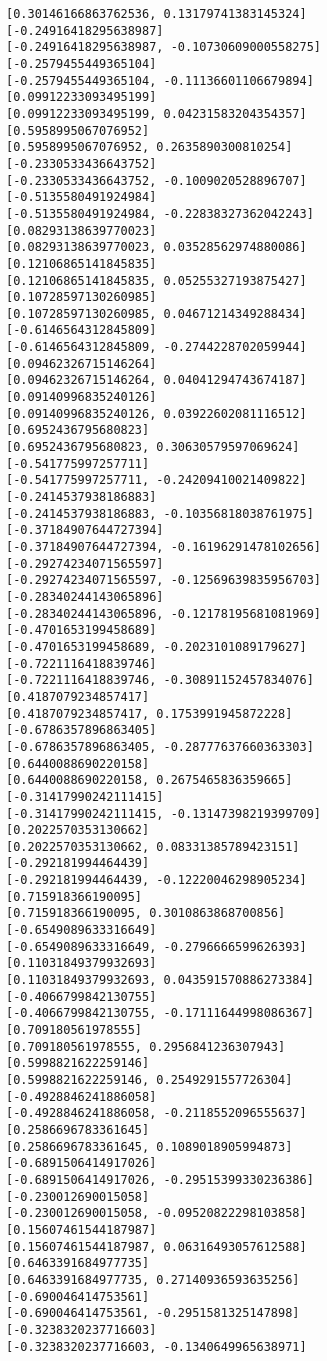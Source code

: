\documentclass[11pt]{article}
\begin{document}
\begin{Verbatim}[commandchars=\\\{\}]
[0.30146166863762536, 0.13179741383145324]
[-0.24916418295638987]
[-0.24916418295638987, -0.10730609000558275]
[-0.2579455449365104]
[-0.2579455449365104, -0.11136601106679894]
[0.09912233093495199]
[0.09912233093495199, 0.04231583204354357]
[0.5958995067076952]
[0.5958995067076952, 0.2635890300810254]
[-0.2330533436643752]
[-0.2330533436643752, -0.1009020528896707]
[-0.5135580491924984]
[-0.5135580491924984, -0.22838327362042243]
[0.08293138639770023]
[0.08293138639770023, 0.03528562974880086]
[0.12106865141845835]
[0.12106865141845835, 0.05255327193875427]
[0.10728597130260985]
[0.10728597130260985, 0.04671214349288434]
[-0.6146564312845809]
[-0.6146564312845809, -0.2744228702059944]
[0.09462326715146264]
[0.09462326715146264, 0.04041294743674187]
[0.09140996835240126]
[0.09140996835240126, 0.03922602081116512]
[0.6952436795680823]
[0.6952436795680823, 0.30630579597069624]
[-0.541775997257711]
[-0.541775997257711, -0.24209410021409822]
[-0.2414537938186883]
[-0.2414537938186883, -0.10356818038761975]
[-0.37184907644727394]
[-0.37184907644727394, -0.16196291478102656]
[-0.29274234071565597]
[-0.29274234071565597, -0.12569639835956703]
[-0.28340244143065896]
[-0.28340244143065896, -0.12178195681081969]
[-0.4701653199458689]
[-0.4701653199458689, -0.2023101089179627]
[-0.7221116418839746]
[-0.7221116418839746, -0.30891152457834076]
[0.4187079234857417]
[0.4187079234857417, 0.1753991945872228]
[-0.6786357896863405]
[-0.6786357896863405, -0.28777637660363303]
[0.6440088690220158]
[0.6440088690220158, 0.2675465836359665]
[-0.31417990242111415]
[-0.31417990242111415, -0.13147398219399709]
[0.2022570353130662]
[0.2022570353130662, 0.08331385789423151]
[-0.292181994464439]
[-0.292181994464439, -0.12220046298905234]
[0.715918366190095]
[0.715918366190095, 0.3010863868700856]
[-0.6549089633316649]
[-0.6549089633316649, -0.2796666599626393]
[0.11031849379932693]
[0.11031849379932693, 0.043591570886273384]
[-0.4066799842130755]
[-0.4066799842130755, -0.17111644998086367]
[0.709180561978555]
[0.709180561978555, 0.2956841236307943]
[0.5998821622259146]
[0.5998821622259146, 0.2549291557726304]
[-0.4928846241886058]
[-0.4928846241886058, -0.2118552096555637]
[0.2586696783361645]
[0.2586696783361645, 0.1089018905994873]
[-0.6891506414917026]
[-0.6891506414917026, -0.29515399330236386]
[-0.230012690015058]
[-0.230012690015058, -0.09520822298103858]
[0.15607461544187987]
[0.15607461544187987, 0.06316493057612588]
[0.6463391684977735]
[0.6463391684977735, 0.27140936593635256]
[-0.690046414753561]
[-0.690046414753561, -0.2951581325147898]
[-0.3238320237716603]
[-0.3238320237716603, -0.1340649965638971]

\end{Verbatim}
\end{document}
